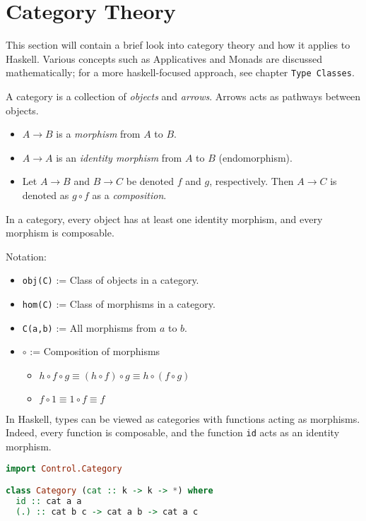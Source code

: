 \section{Category Theory}
This section will contain a brief look into category theory and how it applies to Haskell. Various concepts such as Applicatives and Monads are discussed mathematically; for a more haskell-focused approach, see chapter \texttt{Type Classes}.

A category is a collection of \textit{objects} and \textit{arrows}. Arrows acts as pathways between objects.
\begin{itemize}
  \item $A \to B$ is a \textit{morphism} from $A$ to $B$.
  \item $A \to A$ is an \textit{identity morphism} from $A$ to $B$ (endomorphism).
  \item Let $A \to B$ and $B \to C$ be denoted $f$ and $g$, respectively. Then $A \to C$ is denoted as $g \circ f$ as a \textit{composition}.
\end{itemize}
In a category, every object has at least one identity morphism, and every morphism is composable.

Notation:
\begin{itemize}
  \item \texttt{obj(C)} := Class of objects in a category.
  \item \texttt{hom(C)} := Class of morphisms in a category.
  \item \texttt{C(a,b)} := All morphisms from $a$ to $b$.
  \item $\circ$ := Composition of morphisms
  \begin{itemize}
    \item $h \circ f \circ g \equiv (h \circ f) \circ g \equiv h \circ (f \circ g)$
    \item $f \circ 1 \equiv 1 \circ f \equiv f$
  \end{itemize}
\end{itemize}

In Haskell, types can be viewed as categories with functions acting as morphisms. Indeed, every function is composable, and the function \texttt{id} acts as an identity morphism.

\begin{lstlisting}[language=haskell]
import Control.Category

class Category (cat :: k -> k -> *) where
  id :: cat a a
  (.) :: cat b c -> cat a b -> cat a c
\end{lstlisting}

